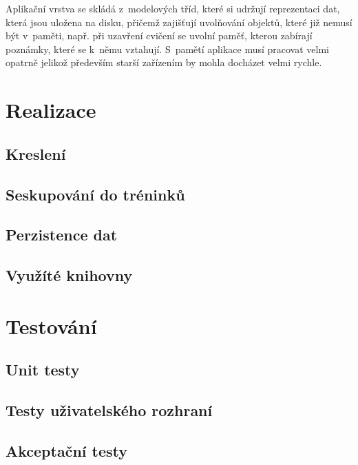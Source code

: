 \documentclass[thesis=B,czech]{FITthesis}[2012/06/26]
\begin{document}
	Aplikační vrstva se skládá z~modelových tříd, které si udržují reprezentaci dat, která jsou uložena na disku, přičemž zajišťují uvolňování objektů, které již nemusí být v~paměti, např. při uzavření cvičení se uvolní paměť, kterou zabírají poznámky, které se k~němu vztahují. S~pamětí aplikace musí pracovat velmi opatrně jelikož především starší zařízením by mohla docházet velmi rychle.

\chapter{Realizace}

	\section{Kreslení}
	\section{Seskupování do tréninků}
	\section{Perzistence dat}
	\section{Využíté knihovny}

\chapter{Testování}

\section{Unit testy}

\section{Testy uživatelského rozhraní}

\section{Akceptační testy}
\end{document}
